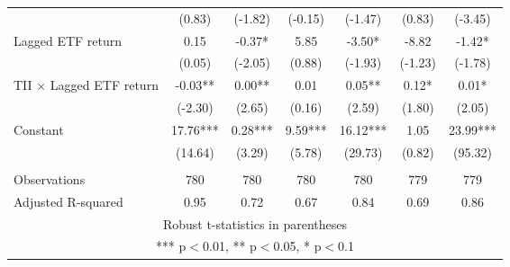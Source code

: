 \documentclass[]{article}
\begin{document}
\begin{tabular}{lcccccc}
 & (0.83) & (-1.82) & (-0.15) & (-1.47) & (0.83) & (-3.45) \\
Lagged ETF return & 0.15 & -0.37* & 5.85 & -3.50* & -8.82 & -1.42* \\
 & (0.05) & (-2.05) & (0.88) & (-1.93) & (-1.23) & (-1.78) \\
TII $\times$ Lagged ETF return & -0.03** & 0.00** & 0.01 & 0.05** & 0.12* & 0.01* \\
 & (-2.30) & (2.65) & (0.16) & (2.59) & (1.80) & (2.05) \\
Constant & 17.76*** & 0.28*** & 9.59*** & 16.12*** & 1.05 & 23.99*** \\
 & (14.64) & (3.29) & (5.78) & (29.73) & (0.82) & (95.32) \\
 &  &  &  &  &  &  \\
Observations & 780 & 780 & 780 & 780 & 779 & 779 \\
 Adjusted R-squared & 0.95 & 0.72 & 0.67 & 0.84 & 0.69 & 0.86 \\ \hline
\multicolumn{7}{c}{ Robust t-statistics in parentheses} \\
\multicolumn{7}{c}{ *** p$<$0.01, ** p$<$0.05, * p$<$0.1} \\
\end{tabular}
\end{document}
